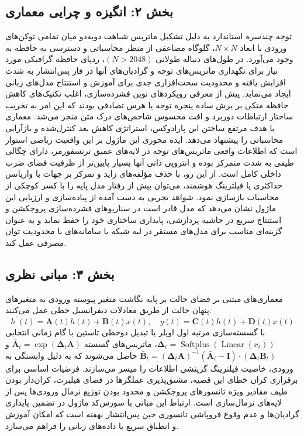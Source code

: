 \subsection*{بخش ۲: انگیزه و چرایی معماری }
توجه چندسره استاندارد  به دلیل تشکیل ماتریس شباهت دو‌به‌دو میان تمامی توکن‌های ورودی با ابعاد $N \times N$، گلوگاه مضاعفی از منظر محاسباتی و دسترسی به حافظه به وجود می‌آورد. در طول‌های دنباله طولانی $(N > 2048)$، ردپای حافظه گرافیکی مورد نیاز برای نگهداری ماتریس‌های توجه و گرادیان‌های آنها در فاز پس‌انتشار به شدت افزایش یافته و محدودیت سخت‌افزاری جدی برای آموزش و استنتاج مدل‌های زبانی ایجاد می‌نماید.
پیش از معرفی رویکردهای نوین فشرده‌سازی، اغلب تکنیک‌های کاهش حافظه متکی بر برش ساده پنجره توجه  یا هرس تصادفی بودند که این امر به تخریب ساختار ارتباطات دوربرد و افت محسوس شاخص‌های درک متن منجر می‌شد. معماری  با هدف مرتفع ساختن این پارادوکس، استراتژی کاهش بعد کنترل‌شده و بازآرایی محاسباتی را پیشنهاد می‌دهد.
ایده محوری این ماژول بر این واقعیت ریاضی استوار است که اطلاعات واقعی ماتریس‌های توجه در لایه‌های عمیق ترنسفورمر، دارای چگالی طیفی به شدت متمرکز بوده و انتروپی ذاتی آنها بسیار پایین‌تر از ظرفیت فضای ضرب داخلی کامل است. از این رو، با حذف مؤلفه‌های زاید و تمرکز بر جهات با واریانس حداکثری یا فیلترینگ هوشمند، می‌توان بیش از  رفتار مدل پایه را با کسر کوچکی از محاسبات بازسازی نمود.
شواهد تجربی به دست آمده از پیاده‌سازی و ارزیابی این ماژول نشان می‌دهد که مدل قادر است در سناریوهای فشرده‌سازی پروجکشن و استنتاج سریع در حاشیه پردازشی، پایداری ساختاری خود را حفظ نماید و به عنوان گزینه‌ای مناسب برای مدل‌های مستقر در لبه شبکه یا سامانه‌های با محدودیت توان مصرفی عمل کند.

\subsection*{بخش ۳: مبانی نظری }
معماری‌های مبتنی بر فضای حالت  بر پایه نگاشت متغیر پیوسته ورودی به متغیرهای پنهان حالت از طریق معادلات دیفرانسیل خطی عمل می‌کنند:
$$h^\prime(t) = \mathbf{A}(t) h(t) + \mathbf{B}(t) x(t), \quad y(t) = \mathbf{C}(t) h(t) + \mathbf{D}(t) x(t)$$
با گسسته‌سازی مرتبه اول اویلر یا تبدیل دوخطی تاستین با گام زمانی انتخابی $\mathbf{\Delta}_t = \operatorname{Softplus}(\operatorname{Linear}(x_t))$، ماتریس‌های گسسته $\mathbf{\bar{A}}_t = \exp(\mathbf{\Delta}_t \mathbf{A})$ و $\mathbf{\bar{B}}_t = (\mathbf{\Delta}_t \mathbf{A})^{-1}(\mathbf{\bar{A}}_t - \mathbf{I})\cdot (\mathbf{\Delta}_t \mathbf{B}_t)$ حاصل می‌شوند که به دلیل وابستگی به ورودی، خاصیت فیلترینگ گزینشی اطلاعات را میسر می‌سازند.
فرضیات اساسی برای برقراری کران خطای این قضیه، مشتق‌پذیری عملگرها در فضای هیلبرت، کران‌دار بودن طیف مقادیر ویژه تانسورهای پروجکشن و محدود بودن توزیع نرمال ورودی‌ها پس از لایه‌های نرمال‌سازی  است.
ارتباط این مبانی با سورس‌کد ماژول  در تضمین پایداری گرادیان‌ها و عدم وقوع فروپاشی تانسوری حین پس‌انتشار نهفته است که امکان آموزش و انطباق سریع با داده‌های زبانی را فراهم می‌سازد.

